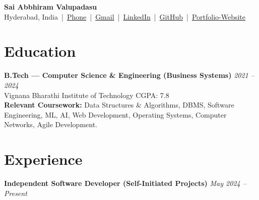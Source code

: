\documentclass[10pt,a4paper]{article}
\begin{document}
	
	\begin{center}
		{\LARGE \textbf{Sai Abbhiram Valupadasu}}\\[6pt]
		Hyderabad, India \,|\,
		\href{tel:+91 9849786297}{Phone} \,|\,
		\href{mailto:valupadasusaiabbhiram@gmail.com}{Gmail} \,|\,
		\href{https://www.linkedin.com/in/Sai-Abbhiram-Valupadasu}{LinkedIn} \,|\,
		\href{https://github.com/ValupadasuSaiabbhiram}{GitHub} \,|\,
		\href{https://personal-portfolio-tan-nine-78.vercel.app/}{Portfolio-Website}
	\end{center}
	
	\section*{Education}
	
	\textbf{B.Tech — Computer Science \& Engineering (Business Systems)} \hfill \textit{2021 -- 2024}\\
	Vignana Bharathi Institute of Technology \hfill CGPA: 7.8 
	\vspace{0.5em}  %
	\\ \textbf{Relevant Coursework:} Data Structures \& Algorithms, DBMS, Software Engineering, ML, AI, Web Development, Operating Systems, Computer Networks, Agile Development.
	
	
	\section*{Experience}
	
	\textbf{Independent Software Developer (Self-Initiated Projects)} \hfill \textit{May 2024 -- Present}
	
\end{document}
